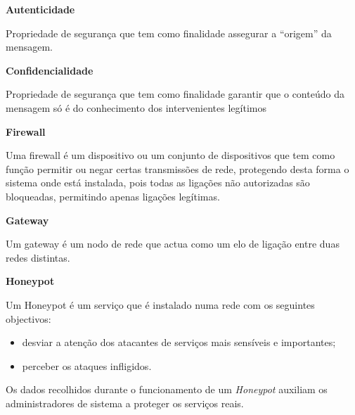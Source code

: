 \label{appendix:1}
\begin{description}
    \item \textbf{Autenticidade}

    Propriedade de segurança que tem como finalidade assegurar a “origem” da mensagem.
\end{description}

\begin{description}
    \item \textbf{Confidencialidade}

    Propriedade de segurança que tem como finalidade garantir que o conteúdo da mensagem só é do conhecimento dos intervenientes legítimos
\end{description}

\begin{description}
    \item \textbf{Firewall}

    Uma firewall é um dispositivo ou um conjunto de dispositivos que tem como função permitir ou negar certas transmissões de rede, protegendo desta forma o sistema onde está instalada, pois todas as ligações não autorizadas são bloqueadas, permitindo apenas ligações legítimas.
\end{description}

\begin{description}
    \item \textbf{Gateway}
    
    Um gateway é um nodo de rede que actua como um elo de ligação entre duas redes distintas.
\end{description}

\begin{description}
    \item \textbf{Honeypot}

    Um Honeypot é um serviço que é instalado numa rede com os seguintes objectivos:
    \begin{itemize}
        \item desviar a atenção dos atacantes de serviços mais sensíveis e importantes;
        \item perceber os ataques infligidos.
    \end{itemize}
    
    Os dados recolhidos durante o funcionamento de um \textit{Honeypot} auxiliam os administradores de sistema a proteger os serviços reais.\\

    
\end{description}

